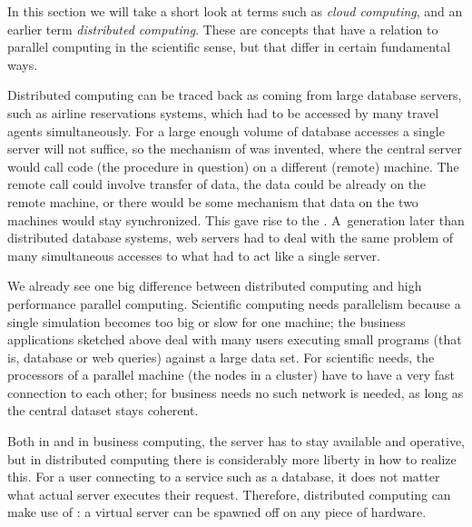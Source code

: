 
In this section we will take a short look at terms such as
\emph{cloud computing}, 
and an earlier term
\emph{distributed computing}.
These are concepts that have a
relation to parallel computing in the scientific sense, but that
differ in certain fundamental ways.

Distributed computing can be traced back
as coming from large database servers, such as
airline reservations systems, which had to be accessed by many travel
agents simultaneously. For a large enough volume of database
accesses a single server will not suffice, so the mechanism of
 was invented, where the central
server would call code (the procedure in question) on a different
(remote) machine. The remote call could involve transfer of data, the
data could be already on the remote machine, or there would be some
mechanism that data on the two machines would stay synchronized. This
gave rise to the . A~generation later than distributed
database systems, web servers had to deal with the same problem of
many simultaneous accesses to what had to act like a single server.

We already see one big difference between distributed computing and
high performance parallel computing. Scientific computing needs
parallelism because a single simulation becomes too big or slow for
one machine; the business applications sketched above deal with many
users executing small programs (that is, database or web queries)
against a large data set. For scientific needs, the processors of a
parallel machine (the nodes in a cluster) have to have a very fast
connection to each other; for business needs no such network is
needed, as long as the central dataset stays coherent.

Both in  and in business computing, the server has to stay
available and operative, but in distributed computing there is
considerably more liberty in how to realize this. For a user
connecting to a service such as a database, it does not matter what
actual server executes their request. Therefore, distributed computing
can make use of : a virtual server can be
spawned off on any piece of hardware.

